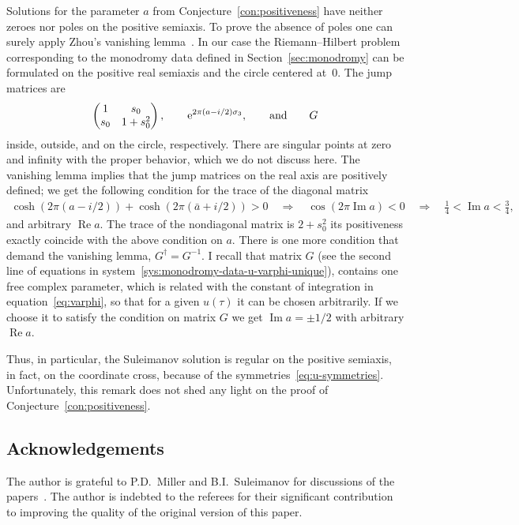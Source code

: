 \documentclass[pdftex]{sigma}
\numberwithin{equation}{section}
\begin{document}
\begin{Remark}
Solutions for the parameter $a$ from Conjecture~\ref{con:positiveness} have neither zeroes nor poles on
the positive semiaxis. To prove the absence of poles one can surely apply Zhou's vanishing lemma~\cite{Z}.
In our case the Riemann--Hilbert problem corresponding to the monodromy data defined in Section~\ref{sec:monodromy}
can be formulated on the positive real semiaxis and the circle centered at~$0$. The jump matrices are
\begin{gather*}
\begin{pmatrix}1&s_0\\s_0&1+s_0^2\end{pmatrix},\qquad
{\rm e}^{2\pi(a-i/2)\sigma_3},\qquad {\rm and}\qquad G
\end{gather*}
inside, outside, and on the circle, respectively. There are singular points at
zero and infinity with the proper behavior, which we do not discuss here.
The vanishing lemma implies that the jump matrices on the real axis are positively defined;
we get the following condition for the trace of the diagonal matrix
\begin{gather*}
\cosh(2\pi(a-i/2))+\cosh(2\pi(\bar{a}+i/2))>0 \quad\Rightarrow\quad
\cos(2\pi\operatorname{Im}a)<0 \quad \Rightarrow \quad \frac14<\operatorname{Im}a<\frac34,
\end{gather*}
and arbitrary $\operatorname{Re}a$. The trace of the nondiagonal matrix is $2+s_0^2$ its positiveness
exactly coincide with the above condition on $a$. There is one more condition that demand
the vanishing lemma, $G^\dagger=G^{-1}$. I recall that matrix $G$ (see the second line of equations in
system~\eqref{sys:monodromy-data-u-varphi-unique}), contains one free complex parameter, which is
related with the constant of integration in equation~\eqref{eq:varphi}, so that for a given $u(\tau)$
it can be chosen arbitrarily. If we choose it to satisfy the condition on matrix $G$ we get
$\operatorname{Im}a=\pm 1/2$ with arbitrary $\operatorname{Re} a$.

Thus, in particular, the Suleimanov solution is regular on the positive semiaxis,
in fact, on the coordinate cross, because of the symmetries~\eqref{eq:u-symmetries}. Unfortunately, this
remark does not shed any light on the proof of Conjecture~\ref{con:positiveness}.
\end{Remark}

\subsection*{Acknowledgements}
The author is grateful to P.D.~Miller and B.I.~Suleimanov for discussions of the papers~\cite{BLM, S}.
The author is indebted to the referees for their significant contribution to improving the quality of
the original version of this paper.
\end{document}
